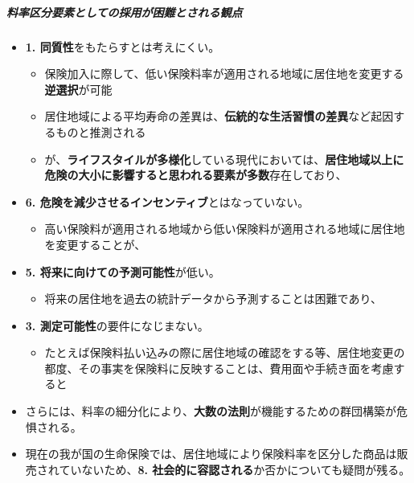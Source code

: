 \documentclass[
]{article}
\providecommand{\tightlist}{%
  \setlength{\itemsep}{0pt}\setlength{\parskip}{0pt}}
\begin{document}
\hypertarget{ux6599ux7387ux533aux5206ux8981ux7d20ux3068ux3057ux3066ux306eux63a1ux7528ux304cux56f0ux96e3ux3068ux3055ux308cux308bux89b3ux70b9}{%
\subparagraph{料率区分要素としての採用が困難とされる観点}\label{ux6599ux7387ux533aux5206ux8981ux7d20ux3068ux3057ux3066ux306eux63a1ux7528ux304cux56f0ux96e3ux3068ux3055ux308cux308bux89b3ux70b9}}

\begin{itemize}
\tightlist
\item
  \textbf{1. 同質性}をもたらすとは考えにくい。

  \begin{itemize}
  \tightlist
  \item
    保険加入に際して、低い保険料率が適用される地域に居住地を変更する\textbf{逆選択}が可能
  \item
    居住地域による平均寿命の差異は、\textbf{伝統的な生活習慣の差異}など起因するものと推測される
  \item
    が、\textbf{ライフスタイルが多様化}している現代においては、\textbf{居住地域以上に危険の大小に影響すると思われる要素が多数}存在しており、
  \end{itemize}
\item
  \textbf{6. 危険を減少させるインセンティブ}とはなっていない。

  \begin{itemize}
  \tightlist
  \item
    高い保険料が適用される地域から低い保険料が適用される地域に居住地を変更することが、
  \end{itemize}
\item
  \textbf{5. 将来に向けての予測可能性}が低い。

  \begin{itemize}
  \tightlist
  \item
    将来の居住地を過去の統計データから予測することは困難であり、
  \end{itemize}
\item
  \textbf{3. 測定可能性}の要件になじまない。

  \begin{itemize}
  \tightlist
  \item
    たとえば保険料払い込みの際に居住地域の確認をする等、居住地変更の都度、その事実を保険料に反映することは、費用面や手続き面を考慮すると
  \end{itemize}
\item
  さらには、料率の細分化により、\textbf{大数の法則}が機能するための群団構築が危惧される。
\item
  現在の我が国の生命保険では、居住地域により保険料率を区分した商品は販売されていないため、\textbf{8.
  社会的に容認される}か否かについても疑問が残る。
\end{itemize}
\end{document}
